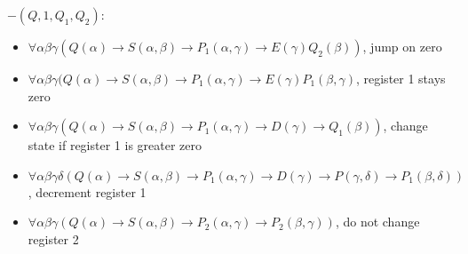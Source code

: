 $-(Q,1,Q_1,Q_2):$
\begin{itemize}
\item $\forall\alpha\beta\gamma(Q(\alpha)\to S(\alpha,\beta)\to P_1(\alpha,\gamma)\to E(\gamma) Q_2(\beta))$, jump on zero
\item $\forall\alpha\beta\gamma(Q(\alpha)\to S(\alpha,\beta)\to P_1(\alpha,\gamma)\to E(\gamma) P_1(\beta,\gamma)$, register 1 stays zero
\item $\forall\alpha\beta\gamma(Q(\alpha)\to S(\alpha,\beta)\to P_1(\alpha,\gamma)\to D(\gamma)\to Q_1(\beta))$, change state if register 1 is greater zero
\item $\forall\alpha\beta\gamma\delta(Q(\alpha)\to S(\alpha,\beta)\to P_1(\alpha,\gamma)\to D(\gamma) \to P(\gamma,\delta)\to P_1(\beta,\delta))$, decrement register 1
\item $\forall\alpha\beta\gamma(Q(\alpha)\to S(\alpha,\beta)\to P_2(\alpha,\gamma)\to P_2(\beta,\gamma))$, do not change register 2
\end{itemize}

